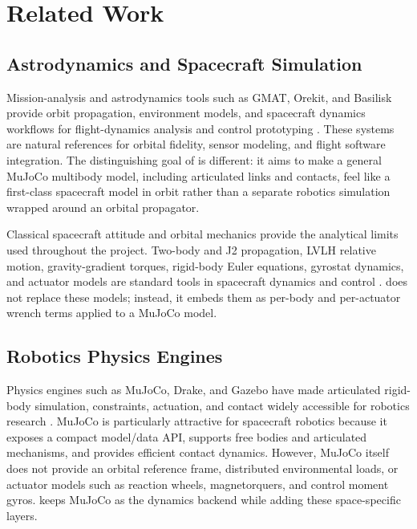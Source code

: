 \section{Related Work}
\label{sec:related}

\subsection{Astrodynamics and Spacecraft Simulation}

Mission-analysis and astrodynamics tools such as GMAT, Orekit, and Basilisk
provide orbit propagation, environment models, and spacecraft dynamics
workflows for flight-dynamics analysis and control prototyping
\cite{gmat,orekit,basilisk}. These systems are natural references for
orbital fidelity, sensor modeling, and flight software integration. The
distinguishing goal of \mjorbit{} is different: it aims to make a general
MuJoCo multibody model, including articulated links and contacts, feel like a
first-class spacecraft model in orbit rather than a separate robotics
simulation wrapped around an orbital propagator.

Classical spacecraft attitude and orbital mechanics provide the analytical
limits used throughout the project. Two-body and J2 propagation, LVLH relative
motion, gravity-gradient torques, rigid-body Euler equations, gyrostat
dynamics, and actuator models are standard tools in spacecraft dynamics and
control \cite{wertz1978spacecraft,wie2008space}. \mjorbit{} does not replace
these models; instead, it embeds them as per-body and per-actuator wrench
terms applied to a MuJoCo model.

\subsection{Robotics Physics Engines}

Physics engines such as MuJoCo, Drake, and Gazebo have made articulated
rigid-body simulation, constraints, actuation, and contact widely accessible
for robotics research \cite{todorov2012mujoco,drake,gazebo}. MuJoCo is
particularly attractive for spacecraft robotics because it exposes a compact
model/data API, supports free bodies and articulated mechanisms, and provides
efficient contact dynamics. However, MuJoCo itself does not provide an orbital
reference frame, distributed environmental loads, or actuator models such as
reaction wheels, magnetorquers, and control moment gyros. \mjorbit{} keeps
MuJoCo as the dynamics backend while adding these space-specific layers.

